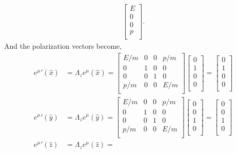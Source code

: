 \documentclass[working, oneside]{../../../Preambles/tuftebook}
\begin{document}
\begin{solution}
\begin{align*}
\begin{bmatrix}
E \\
    0 \\
    0 \\
    p \\
\end{bmatrix}
.\end{align*}
And the polarization vectors become,
\begin{align*}
    e^{\mu }'\left( \hat{x} \right) &= \Lambda_ze^{\mu }\left( \hat{x} \right) =
\begin{bmatrix}
    E /m & 0 & 0 & p /m \\
    0 & 1 & 0 & 0 \\
    0 & 0 & 1 & 0 \\
    p /m & 0 & 0& E /m \\
\end{bmatrix}
\begin{bmatrix}
    0 \\
    1 \\
    0 \\
    0 \\
\end{bmatrix} =
\begin{bmatrix}
    0 \\
    1 \\
    0 \\
    0 \\
\end{bmatrix}\\
    e^{\mu }'\left( \hat{y} \right) &= \Lambda_ze^{\mu }\left(   \hat{y}\right)=
\begin{bmatrix}
    E /m & 0 & 0 & p /m \\
    0 & 1 & 0 & 0 \\
    0 & 0 & 1 & 0 \\
    p /m & 0 & 0& E /m \\
\end{bmatrix}
\begin{bmatrix}
    0 \\
    0 \\
    1 \\
    0 \\
\end{bmatrix} =
\begin{bmatrix}
    0 \\
    0 \\
    1 \\
    0 \\
\end{bmatrix}\\
    e^{\mu }'\left( \hat{z} \right) &= \Lambda_ze^{\mu }\left(   \hat{z}\right)=

\end{align*}
\end{solution}
\end{document}

